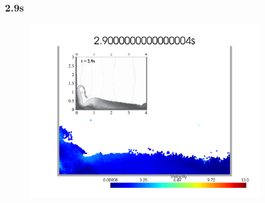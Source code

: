 \begin{frame}
    \frametitle{\subsecname 2.9s}
    \begin{figure}[H]
        \centering
        \includegraphics[width=0.9\textwidth]{images/collapse_dry29_combined.png}
    \end{figure}
\end{frame}